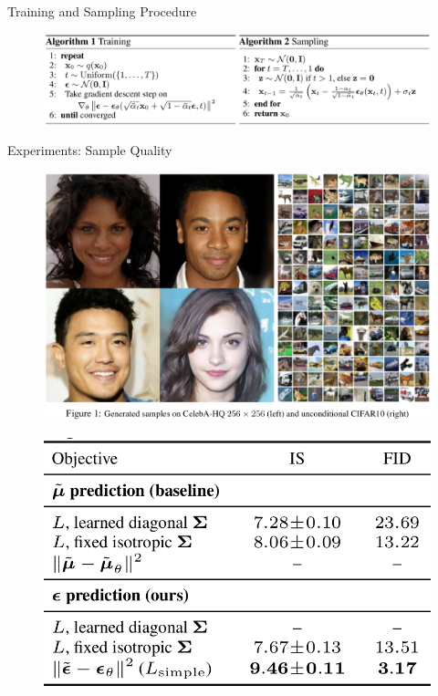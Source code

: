 \documentclass[aspectratio=169, 10pt]{beamer}
\theoremstyle{definition}
\begin{document}
\begin{frame}{Training and Sampling Procedure}
  \begin{figure}[h!]
    \centering
    \includegraphics[width=\textwidth]{./pic/ho_algo.png}
  \end{figure}
\end{frame}
\begin{frame}{Experiments: Sample Quality}
  \begin{minipage}[t]{0.6\textwidth}
    \begin{figure}[h!]
      \centering
      \includegraphics[width=\textwidth]{./pic/ho_celeb.png}
    \end{figure}
  \end{minipage}\hfill%
  \begin{minipage}[t]{0.35\textwidth}
    \begin{figure}[h]
      \centering
      \includegraphics[width=\textwidth]{./pic/ho_result.png}

\end{figure}
\end{minipage}
\end{frame}
\end{document}
